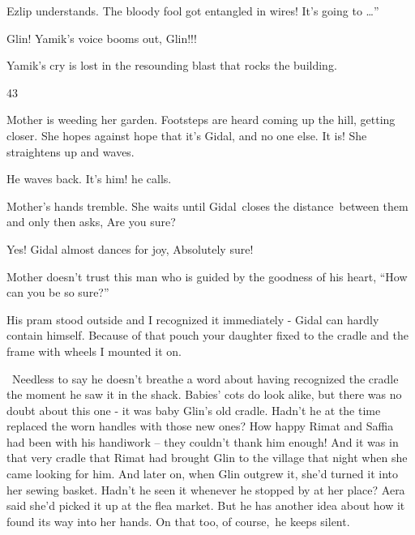 \documentclass[letterpaper]{article}
\begin{document}
Ezlip understands. {\textquotedbl}The bloody fool got entangled in wires! It's going to {\dots}''

{\textquotedbl}Glin!{\textquotedbl} Yamik's voice booms\textcolor[rgb]{0.0,0.4392157,0.7529412}{ }out,
{\textquotedbl}Glin!!!{\textquotedbl}

Yamik's cry is lost in the resounding blast that rocks the building.


\bigskip

43 

Mother is weeding her garden. Footsteps are heard coming up the hill, getting closer. She hopes against hope that it's
Gidal, and\textcolor[rgb]{0.0,0.4392157,0.7529412}{ }no one else. It is! She straightens up and waves. 

He waves back. {\textquotedbl}It's him!{\textquotedbl} he calls. 

Mother's hands tremble. She waits until Gidal~closes the distance~between them and only then
asks,\textcolor[rgb]{0.0,0.4392157,0.7529412}{ }{\textquotedbl}Are you sure?{\textquotedbl} 

{\textquotedbl}Yes!{\textquotedbl} Gidal almost dances for joy, {\textquotedbl}Absolutely sure!{\textquotedbl} 

Mother doesn't trust this man who is guided by the goodness of his heart, ``How can you be so sure?'' 

{\textquotedbl}His pram stood outside and I recognized it immediately -{\textquotedbl} Gidal can hardly contain himself.
{\textquotedbl}Because of that pouch your daughter fixed to the cradle and the frame with wheels I mounted it
on.{\textquotedbl} 

~Needless to say he doesn't breathe a word about having recognized the cradle the moment he saw it in the shack. Babies'
cots do look alike, but there was no doubt about this one - it was baby Glin's old cradle. Hadn't he at the time
replaced the worn handles with those new ones? How happy Rimat and Saffia had been with his handiwork -- they couldn't
thank him enough!\textcolor[rgb]{0.0,0.4392157,0.7529412}{ }And it was in that very cradle that Rimat had
brought\textcolor[rgb]{0.0,0.4392157,0.7529412}{ }Glin to the village that night when she came looking for him. And
later on, when Glin outgrew it, she'd turned it into her sewing basket. Hadn't he seen it whenever he stopped
by\textcolor{red}{ }at\textcolor{red}{ }her place? Aera said she'd picked it up at the flea market. But he has another
idea about how it found its way into her hands. On that too, of course,~he keeps silent. ~~
\end{document}

